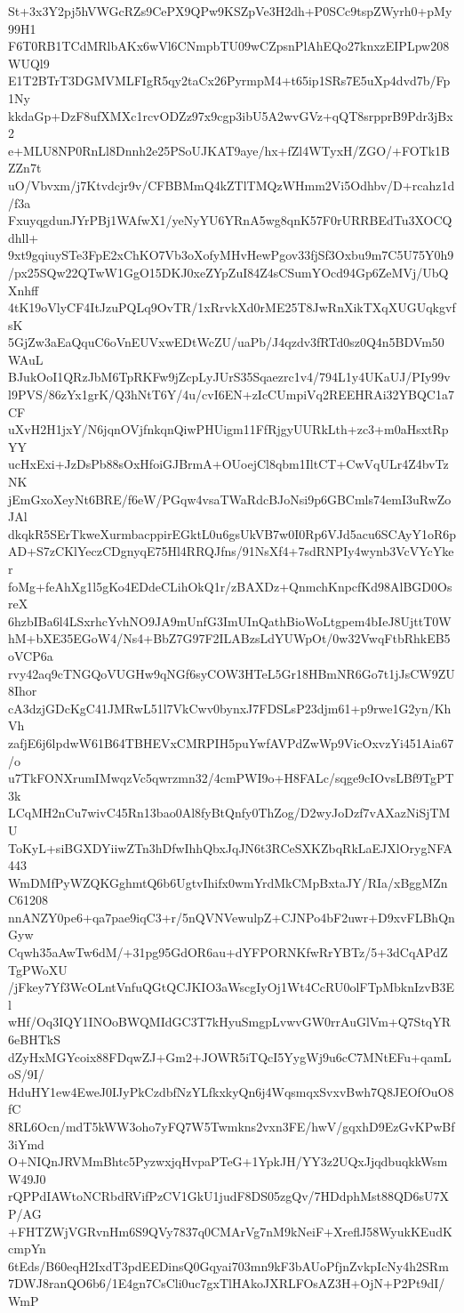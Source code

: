 St+3x3Y2pj5hVWGcRZs9CePX9QPw9KSZpVe3H2dh+P0SCc9tspZWyrh0+pMy99H1
F6T0RB1TCdMRlbAKx6wVl6CNmpbTU09wCZpsnPlAhEQo27knxzEIPLpw208WUQl9
E1T2BTrT3DGMVMLFIgR5qy2taCx26PyrmpM4+t65ip1SRs7E5uXp4dvd7b/Fp1Ny
kkdaGp+DzF8ufXMXc1rcvODZz97x9cgp3ibU5A2wvGVz+qQT8srpprB9Pdr3jBx2
e+MLU8NP0RnLl8Dnnh2e25PSoUJKAT9aye/hx+fZl4WTyxH/ZGO/+FOTk1BZZn7t
uO/Vbvxm/j7Ktvdcjr9v/CFBBMmQ4kZTlTMQzWHmm2Vi5Odhbv/D+rcahz1d/f3a
FxuyqgdunJYrPBj1WAfwX1/yeNyYU6YRnA5wg8qnK57F0rURRBEdTu3XOCQdhll+
9xt9gqiuySTe3FpE2xChKO7Vb3oXofyMHvHewPgov33fjSf3Oxbu9m7C5U75Y0h9
/px25SQw22QTwW1GgO15DKJ0xeZYpZuI84Z4sCSumYOcd94Gp6ZeMVj/UbQXnhff
4tK19oVlyCF4ItJzuPQLq9OvTR/1xRrvkXd0rME25T8JwRnXikTXqXUGUqkgvfsK
5GjZw3aEaQquC6oVnEUVxwEDtWcZU/uaPb/J4qzdv3fRTd0sz0Q4n5BDVm50WAuL
BJukOoI1QRzJbM6TpRKFw9jZcpLyJUrS35Sqaezrc1v4/794L1y4UKaUJ/PIy99v
l9PVS/86zYx1grK/Q3hNtT6Y/4u/cvI6EN+zIcCUmpiVq2REEHRAi32YBQC1a7CF
uXvH2H1jxY/N6jqnOVjfnkqnQiwPHUigm11FfRjgyUURkLth+zc3+m0aHsxtRpYY
ucHxExi+JzDsPb88sOxHfoiGJBrmA+OUoejCl8qbm1IltCT+CwVqULr4Z4bvTzNK
jEmGxoXeyNt6BRE/f6eW/PGqw4vsaTWaRdcBJoNsi9p6GBCmls74emI3uRwZoJAl
dkqkR5SErTkweXurmbacppirEGktL0u6gsUkVB7w0I0Rp6VJd5acu6SCAyY1oR6p
AD+S7zCKlYeczCDgnyqE75Hl4RRQJfns/91NsXf4+7sdRNPIy4wynb3VcVYcYker
foMg+feAhXg1l5gKo4EDdeCLihOkQ1r/zBAXDz+QnmchKnpcfKd98AlBGD0OsreX
6hzbIBa6l4LSxrhcYvhNO9JA9mUnfG3ImUInQathBioWoLtgpem4bIeJ8UjttT0W
hM+bXE35EGoW4/Ns4+BbZ7G97F2ILABzsLdYUWpOt/0w32VwqFtbRhkEB5oVCP6a
rvy42aq9cTNGQoVUGHw9qNGf6syCOW3HTeL5Gr18HBmNR6Go7t1jJsCW9ZU8Ihor
cA3dzjGDcKgC41JMRwL51l7VkCwv0bynxJ7FDSLsP23djm61+p9rwe1G2yn/KhVh
zafjE6j6lpdwW61B64TBHEVxCMRPIH5puYwfAVPdZwWp9VicOxvzYi451Aia67/o
u7TkFONXrumIMwqzVc5qwrzmn32/4cmPWI9o+H8FALc/sqge9cIOvsLBf9TgPT3k
LCqMH2nCu7wivC45Rn13bao0Al8fyBtQnfy0ThZog/D2wyJoDzf7vAXazNiSjTMU
ToKyL+siBGXDYiiwZTn3hDfwIhhQbxJqJN6t3RCeSXKZbqRkLaEJXlOrygNFA443
WmDMfPyWZQKGghmtQ6b6UgtvIhifx0wmYrdMkCMpBxtaJY/RIa/xBggMZnC61208
nnANZY0pe6+qa7pae9iqC3+r/5nQVNVewulpZ+CJNPo4bF2uwr+D9xvFLBhQnGyw
Cqwh35aAwTw6dM/+31pg95GdOR6au+dYFPORNKfwRrYBTz/5+3dCqAPdZTgPWoXU
/jFkey7Yf3WcOLntVnfuQGtQCJKIO3aWscgIyOj1Wt4CcRU0olFTpMbknIzvB3El
wHf/Oq3IQY1INOoBWQMIdGC3T7kHyuSmgpLvwvGW0rrAuGlVm+Q7StqYR6eBHTkS
dZyHxMGYcoix88FDqwZJ+Gm2+JOWR5iTQcI5YygWj9u6cC7MNtEFu+qamLoS/9I/
HduHY1ew4EweJ0IJyPkCzdbfNzYLfkxkyQn6j4WqsmqxSvxvBwh7Q8JEOfOuO8fC
8RL6Ocn/mdT5kWW3oho7yFQ7W5Twmkns2vxn3FE/hwV/gqxhD9EzGvKPwBf3iYmd
O+NIQnJRVMmBhtc5PyzwxjqHvpaPTeG+1YpkJH/YY3z2UQxJjqdbuqkkWsmW49J0
rQPPdIAWtoNCRbdRVifPzCV1GkU1judF8DS05zgQv/7HDdphMst88QD6sU7XP/AG
+FHTZWjVGRvnHm6S9QVy7837q0CMArVg7nM9kNeiF+XreflJ58WyukKEudKcmpYn
6tEds/B60eqH2IxdT3pdEEDinsQ0Gqyai703mn9kF3bAUoPfjnZvkpIcNy4h2SRm
7DWJ8ranQO6b6/1E4gn7CsCli0uc7gxTlHAkoJXRLFOsAZ3H+OjN+P2Pt9dI/WmP
